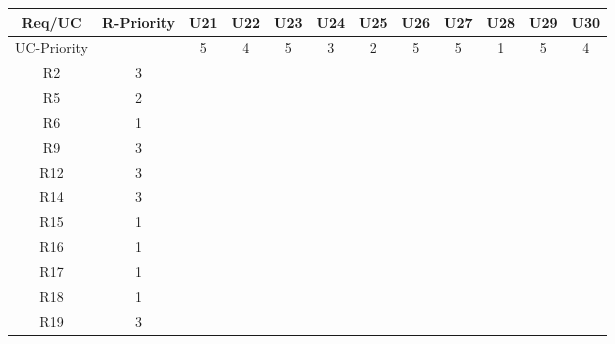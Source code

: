 \documentclass[12pt]{article}
\begin{document}
	\newpage
	\begin{longtable}{|c|c|c|c|c|c|c|c|c|c|c|c|}
		\hline
		Req/UC      & R-Priority & U21      & U22      & U23      & U24      & U25      & U26      & U27      & U28      & U29      & U30      \\
		\hline
		UC-Priority &            & 5         & 4         & 5         & 3         & 2         & 5         & 5         & 1         & 5         & 4         \\
		\hline
		R2          & 3          &           &           &           &           &           &           &           &           &           &           \\
		\hline
		R5          & 2          &           &           &           &           &           &           &           &           &           &           \\
		\hline
		R6          & 1          &           &           &           &           &           &           &           &           &           &           \\
		\hline
		R9          & 3          &           &           &           &           &           &           &           &           &           &           \\
		\hline
		R12         & 3          &           &           &           &           &           &           &           &           &           &           \\
		\hline
		R14         & 3          &           &           &           &           &           &           &           &           &           &           \\
		\hline
		R15         & 1          &           &           &           &           &           &           &           &           &           &           \\
		\hline
		R16         & 1          &           &           &           &           &           &           &           &           &           &           \\
		\hline
		R17         & 1          &           &           &           &           &           &           &           &           &           &           \\
		\hline
		R18         & 1          &           &           &           &           &           &           &           &           &           &           \\
		\hline
		R19         & 3          &           &           &           &           &           &           &           &           &           &           \\

\end{longtable}
\end{document}
